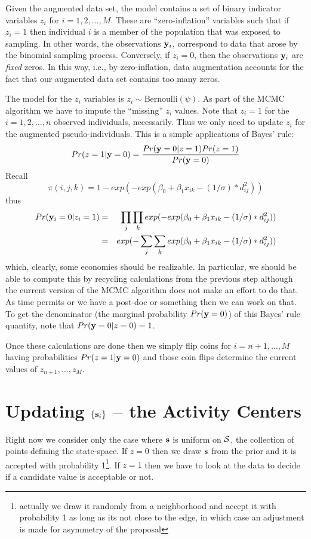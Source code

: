 \documentclass[12pt]{article}
\begin{document}
Given the augmented data set, the model contains a set of binary
indicator variables $z_{i}$ for $i=1,2,\ldots,M$.  These are
``zero-inflation'' variables such that if $z_{i}=1$ then individual
$i$ is a member of the population that was exposed to sampling. In
other words, the observations ${\bf y}_{i}$, correspond to data that
arose by the binomial sampling process. Conversely, if $z_{i}=0$, then
the observations ${\bf y}_{i}$ are {\it fixed} zeros. In this way,
i.e., by zero-inflation, data augmentation accounts for the fact that
our augmented data set contains too many zeros.

The model for the $z_{i}$ variables is $z_{i} \sim
\mbox{Bernoulli}(\psi)$.  As part of the MCMC algorithm we have to
impute the ``missing'' $z_{i}$ values. Note that $z_{i}=1$ for the
$i=1,2,\ldots,n$ observed individuals, necessarily.  Thus we only need
to update $z_{i}$ for the augmented pseudo-individuals. This is a
simple applications of Bayes' rule:
\[
 Pr(z=1|{\bf y} = 0) = \frac{Pr({\bf y}=0|z=1)Pr(z=1) }{Pr({\bf y}=0)}
\]
Recall
\[
 \pi(i,j,k) = 1-exp(- 
exp( \beta_{0} + \beta_{1}x_{ik} - (1/\sigma)*d_{ij}^{2} ))
\]
thus
\begin{eqnarray}
Pr({\bf y}_{i} = 0|z_{i}=1) &=&
 \prod_{j} \prod_{k} exp(- exp( \beta_{0} + \beta_{1}x_{ik} -  (1/\sigma)*d_{ij}^{2} )) \\
 & = & exp(- \sum_{j} \sum_{k} exp( \beta_{0} + \beta_{1}x_{ik} -  (1/\sigma)*d_{ij}^{2} ))
\end{eqnarray}
which, clearly, some economies should be realizable.  In particular,
we should be able to compute this by recycling calculations from the
previous step although the current version of the MCMC algorithm does
not make an effort to do that.  As time permits or we have a post-doc
or something then we can work on that.  To get the denominator (the
marginal probability $Pr({\bf y} = 0)$) of this Bayes' rule quantity,
note that $Pr({\bf y}=0|z=0) = 1$.

Once these calculations are done then we simply flip coins for
$i=n+1,\ldots,M$ having probabilities $Pr(z=1|{\bf y} = 0)$ and those
coin flips determine the current values of $z_{n+1},\ldots,z_{M}$.



\section{Updating $\{ {\bf s}_{i} \}$ -- the Activity Centers}

Right now we consider only the case where ${\bf s}$ is uniform on ${\cal
  S}$, the collection of points defining the state-space.  If $z=0$
then we draw ${\bf s}$ from the prior and it is accepted with
probability 1\footnote{actually we draw it randomly from a
  neighborhood and accept it with probability 1 as long as its not
  close to the edge, in which case an adjustment is made for asymmetry
  of the proposal}.  If $z=1$ then we have
to look at the data to decide if a candidate value is acceptable or not.
\end{document}
